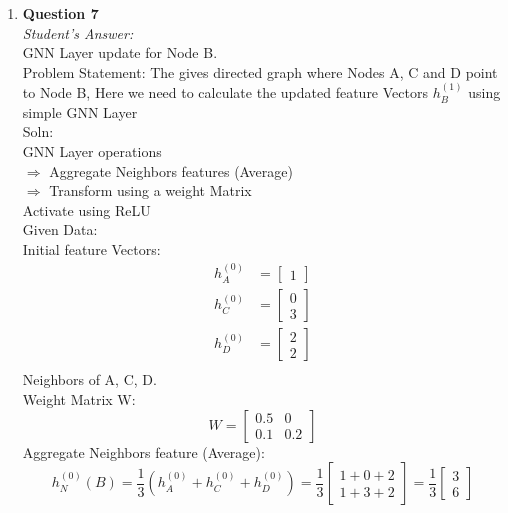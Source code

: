 \documentclass[a4paper,12pt]{article}
\begin{document}
\begin{enumerate}
    \item \textbf{Question 7} \\
    \textit{Student's Answer:} \\
    GNN Layer update for Node B. \\
    Problem Statement: The gives directed graph where Nodes A, C and D point to Node B, Here we need to calculate the updated feature Vectors \( h^{(1)}_B \) using simple GNN Layer \\
    Soln: \\
    GNN Layer operations \\
    $\Rightarrow$ Aggregate Neighbors features (Average) \\
    $\Rightarrow$ Transform using a weight Matrix \\
    Activate using ReLU \\
    Given Data: \\
    Initial feature Vectors: \\
    \[
    \begin{align*}
    h^{(0)}_A &= \begin{bmatrix} 1 \end{bmatrix} \\
    h^{(0)}_C &= \begin{bmatrix} 0 \\ 3 \end{bmatrix} \\
    h^{(0)}_D &= \begin{bmatrix} 2 \\ 2 \end{bmatrix} \\
    \end{align*}
    \]
    Neighbors of A, C, D. \\
    Weight Matrix W: \\
    \[
    W = \begin{bmatrix} 0.5 & 0 \\ 0.1 & 0.2 \end{bmatrix}
    \]
    Aggregate Neighbors feature (Average): \\
    \[
    h^{(0)}_N (B) = \frac{1}{3} \left( h^{(0)}_A + h^{(0)}_C + h^{(0)}_D \right) = \frac{1}{3} \begin{bmatrix} 1 + 0 + 2 \\ 1 + 3 + 2 \end{bmatrix} = \frac{1}{3} \begin{bmatrix} 3 \\ 6 \end{bmatrix}
    \]

\end{enumerate}
\end{document}
